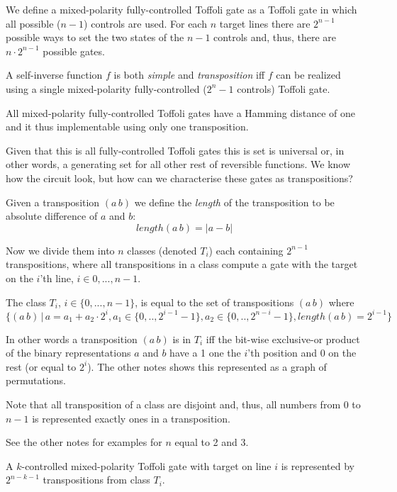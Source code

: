 \medskip {}\enspace We define a mixed-polarity fully-controlled Toffoli gate as a Toffoli gate in which all possible ($n - 1$) controls are used. For each $n$ target lines there are $2^{n-1}$ possible ways to set the two states of the $n-1$ controls and, thus, there are $n \cdot 2^{n-1}$ possible gates.

\smallskip {} A self-inverse function $f$ is both {\it simple\/} and {\it transposition\/} iff $f$ can be realized using a single mixed-polarity fully-controlled ($2^n-1$ controls) Toffoli gate.

\smallskip{} All mixed-polarity fully-controlled Toffoli gates have a Hamming distance of one and it thus implementable using only one transposition. \qquad\slug

Given that this is all fully-controlled Toffoli gates this is set is universal or, in other words, a generating set for all other rest of reversible functions. We know how the circuit look, but how can we characterise these gates as transpositions?

\smallskip {} Given a transposition $(a\,b)$ we define the {\it length} of the transposition to be absolute difference of $a$ and $b$:
$$
length (a\,b) = |a - b|
$$

Now we divide them into $n$ classes (denoted $T_i$) each containing $2^{n-1}$ transpositions, where all transpositions in a class compute a gate with the target on the $i$'th line, $i \in {0,...,n-1}$.

\smallskip {} The class $T_i$, $i \in \{0,...,n-1\}$, is equal to the set of transpositions $(a\,b)$ where 
$$
\{(a\,b) \,|\, a = a_1 + a_2 \cdot 2^i, a_1 \in \{0,..,2^{i-1}-1\}, a_2 \in \{0,..,2^{n-i}-1\}, length (a\,b) = 2^{i-1} \}
$$

In other words a transposition $(a\,b)$ is in $T_i$ iff the bit-wise exclusive-or product of the binary representations $a$ and $b$ have a 1 one the $i$'th position and 0 on the rest (or equal to $2^i$). The other notes shows this represented as a graph of permutations.

Note that all transposition of a class are disjoint and, thus, all numbers from 0 to $n-1$ is represented exactly ones in a transposition.

\smallskip{} See the other notes for examples for $n$ equal to 2 and 3. 

\smallskip {} A $k$-controlled mixed-polarity Toffoli gate with target on line $i$ is represented by $2^{n-k-1}$ transpositions from class $T_i$.

